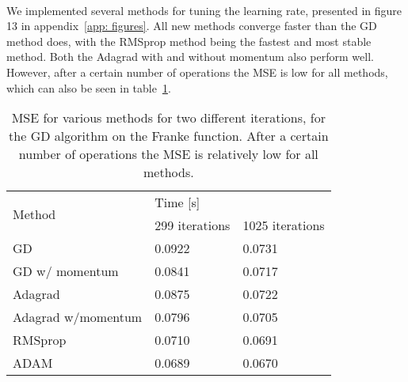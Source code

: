 \documentclass[english,notitlepage,reprint,nofootinbib]{revtex4-2}  %
\begin{document}
\vspace{3mm}
\\ 
We implemented several methods for tuning the learning rate, presented in figure 13
 in appendix~\ref{app: figures}. 
All new methods converge faster than the GD method does, with the RMSprop method being the fastest and most stable method. Both the Adagrad with and without momentum also perform well. 
However, after a certain number of operations the MSE is low for all methods, which can also be seen in table~\ref{table: tab2}. 
\begin{table}[]
\begin{tabular}{|l|ll|}
\hline
\multirow{2}{*}{Method} & \multicolumn{2}{l|}{Time {[}s{]}}                     \\ \cline{2-3} 
                        & \multicolumn{1}{l|}{299 iterations} & 1025 iterations \\ \hline
GD                      & \multicolumn{1}{l|}{0.0922}         & 0.0731          \\ \hline
GD w/ momentum          & \multicolumn{1}{l|}{0.0841}         & 0.0717          \\ \hline
Adagrad                 & \multicolumn{1}{l|}{0.0875}         & 0.0722          \\ \hline
Adagrad w/momentum      & \multicolumn{1}{l|}{0.0796}         & 0.0705          \\ \hline
RMSprop                 & \multicolumn{1}{l|}{0.0710}         & 0.0691          \\ \hline
ADAM                    & \multicolumn{1}{l|}{0.0689}         & 0.0670          \\ \hline
\end{tabular}
\caption{MSE for various methods for two different iterations, for the GD algorithm on the Franke function. After a certain number of operations the MSE is relatively low for all methods. }
\label{table: tab2}
\end{table}
\vspace{3mm}
\\ 
\end{document}

